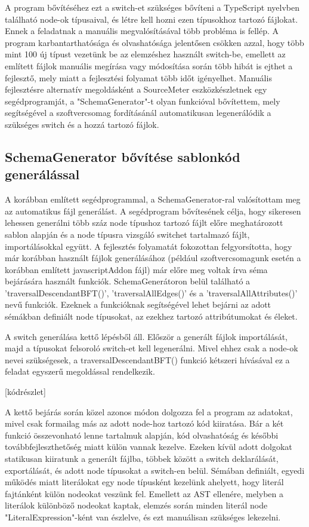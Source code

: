 A program bővítéséhez ezt a switch-et szükséges bővíteni a TypeScript nyelvben található node-ok típusaival, és létre kell hozni ezen típusokhoz tartozó fájlokat.
Ennek a feladatnak a manuális megvalósításával több probléma is fellép. A program karbantarthatósága és olvashatósága jelentősen csökken azzal, hogy több mint 100 új típust vezetünk be az elemzéshez használt switch-be, emellett az említett fájlok manuális megírása vagy módosítása során több hibát is ejthet a fejlesztő, mely miatt a fejlesztési folyamat több időt igényelhet. Manuális fejlesztésre alternatív megoldásként a SourceMeter eszközkészletnek egy segédprogramját, a "SchemaGenerator"-t olyan funkcióval bővítettem, mely segítségével a szoftvercsomag fordításánál automatikusan legenerálódik a szükséges switch és a hozzá tartozó fájlok. 

\subsection{SchemaGenerator bővítése sablonkód generálással}

A korábban említett segédprogrammal, a SchemaGenerator-ral valósítottam meg az automatikus fájl generálást.
A segédprogram bővítesének célja, hogy sikeresen lehessen generálni több száz node típushoz tartozó fájlt előre meghatározott sablon alapján és a node típusra vizsgáló switchet tartalmazó fájlt, importálásokkal együtt. A fejlesztés folyamatát fokozottan felgyorsította, hogy már korábban használt fájlok generálásához (például szoftvercsomagunk esetén a korábban említett javascriptAddon fájl) már előre meg voltak írva séma bejárására használt funkciók. 
SchemaGenerátoron belül található a 'traversalDescendantBFT()', 'traversalAllEdges()' és a 'traversalAllAttributes()' nevű funkciók. Ezeknek a funkcióknak segítségével lehet bejárni az adott sémákban definiált node típusokat, az ezekhez tartozó attribútumokat és éleket.  

A switch generálása kettő lépésből áll. Először a generált fájlok importálását, majd a típusokat felsoroló switch-et kell legenerálni. Mivel ehhez csak a node-ok nevei szükségesek, a traversalDescendantBFT() funkció kétszeri hívásával ez a feladat egyszerű megoldással rendelkezik.

[kódrészlet]

A kettő bejárás során közel azonos módon dolgozza fel a program az adatokat, mivel csak formailag más az adott node-hoz tartozó kód kiiratása. Bár a két funkció összevonható lenne tartalmuk alapján, kód olvashatóság és későbbi továbbfejleszthetőség miatt külön vannak kezelve.
Ezeken kívül adott dolgokat statikusan kiiratunk a generált fájlba, többek között a switch deklarálását, exportálását, és adott node típusokat a switch-en belül. Sémában definiált, egyedi működés miatt literálokat egy node típusként kezelünk ahelyett, hogy literál fajtánként külön nodeokat veszünk fel. Emellett az AST ellenére, melyben a literálok különböző nodeokat kaptak, elemzés során minden literál node "LiteralExpression"-ként van észlelve, és ezt manuálisan szükséges lekezelni.

